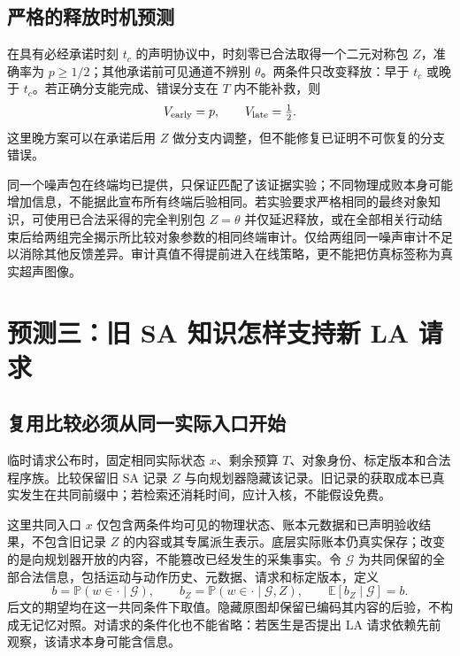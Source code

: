 \documentclass[11pt,a4paper,fontset=fandol]{ctexart}
\theoremstyle{definition}
\theoremstyle{remark}
\numberwithin{equation}{section}
\newcommand{\E}{\mathbb E}
\newcommand{\Pp}{\mathbb P}
\begin{document}
\subsection{严格的释放时机预测}
在具有必经承诺时刻 $t_c$ 的声明协议中，时刻零已合法取得一个二元对称包 $Z$，准确率为 $p\ge1/2$；其他承诺前可见通道不辨别 $\theta$。两条件只改变释放：早于 $t_c$ 或晚于 $t_c$。若正确分支能完成、错误分支在 $T$ 内不能补救，则
\begin{equation}
 V_{\rm early}=p,\qquad V_{\rm late}=\tfrac12.
 \label{eq:timing-prediction}
\end{equation}
这里晚方案可以在承诺后用 $Z$ 做分支内调整，但不能修复已证明不可恢复的分支错误。

同一个噪声包在终端均已提供，只保证匹配了该证据实验；不同物理成败本身可能增加信息，不能据此宣布所有终端后验相同。若实验要求严格相同的最终对象知识，可使用已合法采得的完全判别包 $Z=\theta$ 并仅延迟释放，或在全部相关行动结束后给两组完全揭示所比较对象参数的相同终端审计。仅给两组同一噪声审计不足以消除其他反馈差异。审计真值不得提前进入在线策略，更不能把仿真标签称为真实超声图像。

\section{预测三：旧 SA 知识怎样支持新 LA 请求}
\label{sec:memory}
\subsection{复用比较必须从同一实际入口开始}
临时请求公布时，固定相同实际状态 $x$、剩余预算 $T$、对象身份、标定版本和合法程序族。比较保留旧 SA 记录 $Z$ 与向规划器隐藏该记录。旧记录的获取成本已真实发生在共同前缀中；若检索还消耗时间，应计入核，不能假设免费。

这里共同入口 $x$ 仅包含两条件均可见的物理状态、账本元数据和已声明验收结果，不包含旧记录 $Z$ 的内容或其专属派生表示。底层实际账本仍真实保存；改变的是向规划器开放的内容，不能篡改已经发生的采集事实。令 $\mathcal G$ 为共同保留的全部合法信息，包括运动与动作历史、元数据、请求和标定版本，定义
\[
 b=\Pp(w\in\cdot\mid\mathcal G),\qquad
 b_Z=\Pp(w\in\cdot\mid\mathcal G,Z),\qquad
 \E[b_Z\mid\mathcal G]=b.
\]
后文的期望均在这一共同条件下取值。隐藏原图却保留已编码其内容的后验，不构成无记忆对照。对请求的条件化也不能省略：若医生是否提出 LA 请求依赖先前观察，该请求本身可能含信息。
\end{document}
